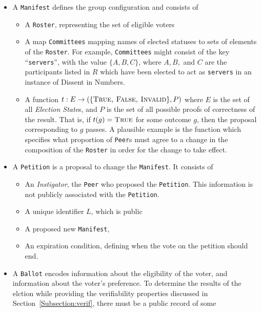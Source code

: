 \begin{itemize}
  \item A \texttt{Manifest} defines the group configuration and consists of
  \begin{itemize}
    \item A \texttt{Roster}, representing the set of eligible voters
    \item A map \texttt{Committees} mapping names of elected statuses to sets of
      elements of the \texttt{Roster}. For example, \texttt{Committees} might
      consist of the key ``\texttt{servers}'', with the value $\{A, B, C\}$, where
      $A, B,$ and $C$ are the participants listed in $R$ which have been elected
      to act as \texttt{servers} in an instance of Dissent in Numbers.
    \item A function $t : E \to (\{\textsc{True, False, Invalid}\}, P)$
      where $E$ is the set of all \emph{Election State}s, and $P$ is the set
      of all possible proofs of correctness of the result. That is, if $t(g) =
      \textsc{True}$ for some outcome $g$, then the proposal corresponding to
      $g$ passes.
      A plausible example is the function which
      specifies what proportion of \texttt{Peer}s must agree to a change in the
      composition of the \texttt{Roster} in order for the change to take effect.
  \end{itemize}
  \item A \texttt{Petition} is a proposal to change the \texttt{Manifest}. It
    consists of
    \begin{itemize}
      \item An \emph{Instigator}, the \texttt{Peer} who proposed the
        \texttt{Petition}. This information is not publicly associated with
        the \texttt{Petition}.
      \item A unique identifier $L$, which is public
      \item A proposed new \texttt{Manifest},
      \item An expiration condition, defining when the vote on the petition
        should end.
    \end{itemize}
  \item A \texttt{Ballot} encodes information about the eligibility of the voter,
    and information about the voter's preference. To determine the results of
    the elction while providing the verifiability properties discussed in
    Section~\ref{Subsection:verif}, there must be a public record of some

\end{itemize}

